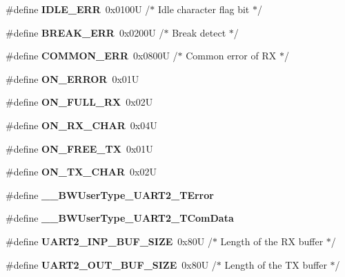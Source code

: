 \begin{DoxyCompactItemize}
\#define {\bfseries I\+D\+L\+E\+\_\+\+E\+RR}~0x0100\+U       /$\ast$ Idle character flag bit   $\ast$/
\item 
\mbox{\label{group___u_a_r_t2__module_ga0cb4d61ee3347eb62142ca0eb1d02a53}} 
\#define {\bfseries B\+R\+E\+A\+K\+\_\+\+E\+RR}~0x0200\+U       /$\ast$ Break detect              $\ast$/
\item 
\mbox{\label{group___u_a_r_t2__module_ga86e7d2a6a6227d9fbb84d459454c2359}} 
\#define {\bfseries C\+O\+M\+M\+O\+N\+\_\+\+E\+RR}~0x0800\+U       /$\ast$ Common error of R\+X       $\ast$/
\item 
\mbox{\label{group___u_a_r_t2__module_gab5034f048fef6a41e7901a4e34368f3d}} 
\#define {\bfseries O\+N\+\_\+\+E\+R\+R\+OR}~0x01U
\item 
\mbox{\label{group___u_a_r_t2__module_ga2cf6b6a2b8c83f7d1d7e6134c6bd9a4a}} 
\#define {\bfseries O\+N\+\_\+\+F\+U\+L\+L\+\_\+\+RX}~0x02U
\item 
\mbox{\label{group___u_a_r_t2__module_gad07f43952e300ba1e45521ce777c09d4}} 
\#define {\bfseries O\+N\+\_\+\+R\+X\+\_\+\+C\+H\+AR}~0x04U
\item 
\mbox{\label{group___u_a_r_t2__module_ga71d35387335972e4f6ae07ecccf27724}} 
\#define {\bfseries O\+N\+\_\+\+F\+R\+E\+E\+\_\+\+TX}~0x01U
\item 
\mbox{\label{group___u_a_r_t2__module_gaf02aa8bfc7e9b5338168db9ff9077c0d}} 
\#define {\bfseries O\+N\+\_\+\+T\+X\+\_\+\+C\+H\+AR}~0x02U
\item 
\mbox{\label{group___u_a_r_t2__module_ga41cb98d6f8558bdc9f7adb5c7e635e5e}} 
\#define {\bfseries \+\_\+\+\_\+\+B\+W\+User\+Type\+\_\+\+U\+A\+R\+T2\+\_\+\+T\+Error}
\item 
\mbox{\label{group___u_a_r_t2__module_ga9b7e83104d112838e660427679c9904c}} 
\#define {\bfseries \+\_\+\+\_\+\+B\+W\+User\+Type\+\_\+\+U\+A\+R\+T2\+\_\+\+T\+Com\+Data}
\item 
\mbox{\label{group___u_a_r_t2__module_ga990ba4afb1a5d138b2ddc6a672e4cf14}} 
\#define {\bfseries U\+A\+R\+T2\+\_\+\+I\+N\+P\+\_\+\+B\+U\+F\+\_\+\+S\+I\+ZE}~0x80\+U      /$\ast$ Length of the R\+X buffer $\ast$/
\item 
\mbox{\label{group___u_a_r_t2__module_gabf5dff44d70d7900bb36429f4824f563}} 
\#define {\bfseries U\+A\+R\+T2\+\_\+\+O\+U\+T\+\_\+\+B\+U\+F\+\_\+\+S\+I\+ZE}~0x80\+U      /$\ast$ Length of the T\+X buffer $\ast$/
\end{DoxyCompactItemize}

